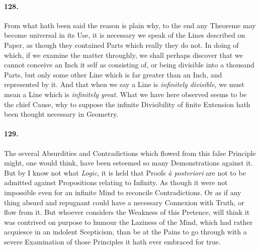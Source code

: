 \documentclass[]{article}
\newenvironment{sectionbody}{\begin{multicols}{2}}{\end{multicols}}
\begin{document}
\begin{sectionbody}
\paragraph{128.} From what hath been said the reason is plain why, to the end any
Theoreme may become universal in its Use, it is necessary we
speak of the Lines described on Paper, as though they contained
Parts which really they do not.  In doing of which, if we examine
the matter throughly, we shall perhaps discover that we cannot
conceive an Inch it self as consisting of, or being divisible
into a thousand Parts, but only some other Line which is far
greater than an Inch, and represented by it.  And that when we
say a Line is \emph{infinitely divisible}, we must mean a Line
which is \emph{infinitely great}.  What we have here observed
seems to be the chief Cause, why to suppose the infinite
Divisibility of finite Extension hath been thought necessary in
Geometry.



\paragraph{129.} The several Absurdities and Contradictions which flowed from this
false Principle might, one would think, have been esteemed so
many Demonstrations against it.  But by I know not what
\emph{Logic}, it is held that Proofs \emph{\`{a} posteriori} are
not to be admitted against Propositions
relating to Infinity.  As though it were not impossible even for
an infinite Mind to reconcile Contradictions.  Or as if any thing
absurd and repugnant could have a necessary Connexion with Truth,
or flow from it.  But whoever considers the Weakness of this
Pretence, will think it was contrived on purpose to humour the
Laziness of the Mind, which had rather acquiesce in an indolent
Scepticism, than be at the Pains to go through with a severe
Examination of those Principles it hath ever embraced for true.




\end{sectionbody}
\end{document}
